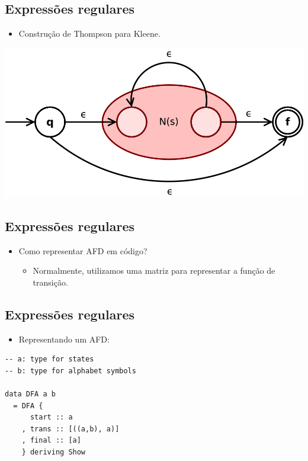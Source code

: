 \documentclass[11pt]{article}
\begin{document}
\subsection*{Expressões regulares}
\label{sec:org2ef038b}

\begin{itemize}
\item Construção de Thompson para Kleene.
\end{itemize}

\begin{center}
\includegraphics[width=.9\linewidth]{./Thompson-kleene-star.png}
\end{center}
\subsection*{Expressões regulares}
\label{sec:org5a346c2}

\begin{itemize}
\item Como representar AFD em código?
\begin{itemize}
\item Normalmente, utilizamos uma matriz para representar a função de transição.
\end{itemize}
\end{itemize}
\subsection*{Expressões regulares}
\label{sec:org61722ac}

\begin{itemize}
\item Representando um AFD:
\end{itemize}

\begin{verbatim}
-- a: type for states
-- b: type for alphabet symbols

data DFA a b
  = DFA {
      start :: a
    , trans :: [((a,b), a)]
    , final :: [a]
    } deriving Show
\end{verbatim}
\end{document}
